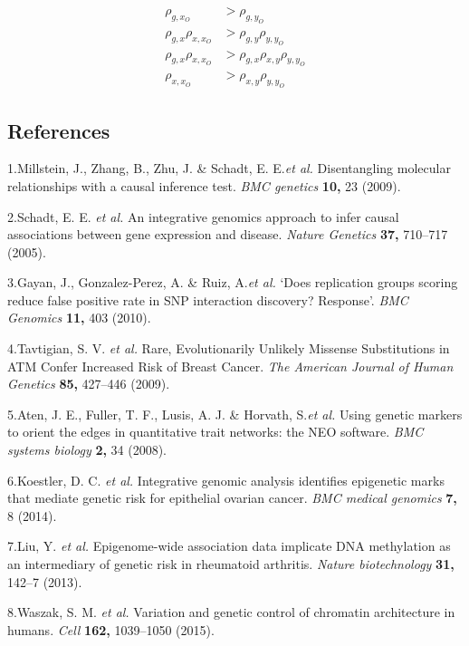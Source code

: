 \documentclass[]{article}
\begin{document}
\[
\begin{aligned}
\rho_{g, x_O} & > \rho_{g, y_O} \\
\rho_{g, x} \rho_{x, x_O} & > \rho_{g,y}\rho_{y,y_O}\\
\rho_{g, x} \rho_{x, x_O} & > \rho_{g,x}\rho_{x,y}\rho_{y,y_O}\\
\rho_{x, x_O} & > \rho_{x,y}\rho_{y,y_O}
\end{aligned}
\]

\newpage

\subsection*{References}\label{references}

1.Millstein, J., Zhang, B., Zhu, J. \& Schadt, E. E.\emph{et al.}
Disentangling molecular relationships with a causal inference test.
\emph{BMC genetics} \textbf{10,} 23 (2009).

2.Schadt, E. E. \emph{et al.} An integrative genomics approach to infer
causal associations between gene expression and disease. \emph{Nature
Genetics} \textbf{37,} 710--717 (2005).

3.Gayan, J., Gonzalez-Perez, A. \& Ruiz, A.\emph{et al.} `Does
replication groups scoring reduce false positive rate in SNP interaction
discovery? Response'. \emph{BMC Genomics} \textbf{11,} 403 (2010).

4.Tavtigian, S. V. \emph{et al.} Rare, Evolutionarily Unlikely Missense
Substitutions in ATM Confer Increased Risk of Breast Cancer. \emph{The
American Journal of Human Genetics} \textbf{85,} 427--446 (2009).

5.Aten, J. E., Fuller, T. F., Lusis, A. J. \& Horvath, S.\emph{et al.}
Using genetic markers to orient the edges in quantitative trait
networks: the NEO software. \emph{BMC systems biology} \textbf{2,} 34
(2008).

6.Koestler, D. C. \emph{et al.} Integrative genomic analysis identifies
epigenetic marks that mediate genetic risk for epithelial ovarian
cancer. \emph{BMC medical genomics} \textbf{7,} 8 (2014).

7.Liu, Y. \emph{et al.} Epigenome-wide association data implicate DNA
methylation as an intermediary of genetic risk in rheumatoid arthritis.
\emph{Nature biotechnology} \textbf{31,} 142--7 (2013).

8.Waszak, S. M. \emph{et al.} Variation and genetic control of chromatin
architecture in humans. \emph{Cell} \textbf{162,} 1039--1050 (2015).
\end{document}
